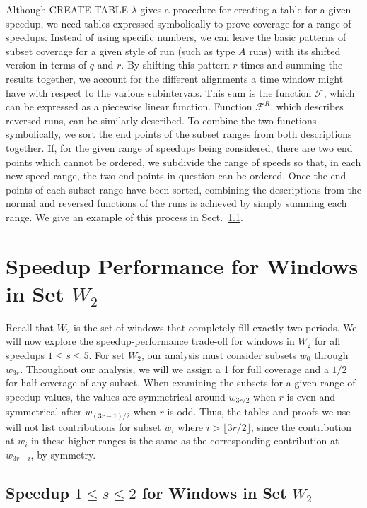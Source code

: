 \documentclass[11pt]{article}
\begin{document}
Although CREATE-TABLE-$\lambda$ gives a procedure for creating a table for a given speedup, we need tables expressed symbolically to prove coverage for a range of speedups.  Instead of using specific numbers, we can leave the basic patterns of subset coverage for a given style of run (such as type $A$ runs) with its shifted version in terms of $q$ and $r$.  By shifting this pattern $r$ times and summing the results together, we account for the different alignments a time window might have with respect to the various subintervals.  This sum is the function $\mathcal{F}$, which can be expressed as a piecewise linear function.  Function $\mathcal{F}^R$, which describes reversed runs, can be similarly described.  To combine the two functions symbolically, we sort the end points of the subset ranges from both descriptions together.  If, for the given range of speedups being considered, there are two end points which cannot be ordered, we subdivide the range of speeds so that, in each new speed range, the two end points in question can be ordered.  Once the end points of each subset range have been sorted, combining the descriptions from the normal and reversed functions of the runs is achieved by simply summing each range.  We give an example of this process in Sect.~\ref{subsection:1<s<2 W_2}.


\section{Speedup Performance for Windows in Set $W_2$}
\label{section:performance W_2}

Recall that $W_2$ is the set of windows that completely fill exactly two periods.
We will now explore the speedup-performance trade-off for windows in $W_2$ for all speedups $1 \leq s \leq 5$.  For set $W_2$, our analysis must consider subsets $w_0$ through $w_{3r}$.  Throughout our analysis, we will we assign a 1 for full coverage and a $1/2$ for half coverage of any subset.  When examining the subsets for a given range of speedup values, the values are symmetrical around $w_{3r/2}$ when $r$ is even and symmetrical after $w_{(3r - 1)/2}$ when $r$ is odd.  Thus, the tables and proofs we use will not list contributions for subset $w_i$ where $i > \lfloor 3r/2 \rfloor$,  since the contribution at $w_i$ in these higher ranges is the same as the corresponding contribution at $w_{3r - i}$, by symmetry.

\subsection{Speedup $1 \leq s \leq 2$ for Windows in Set $W_2$}
\label{subsection:1<s<2 W_2}
\end{document}
